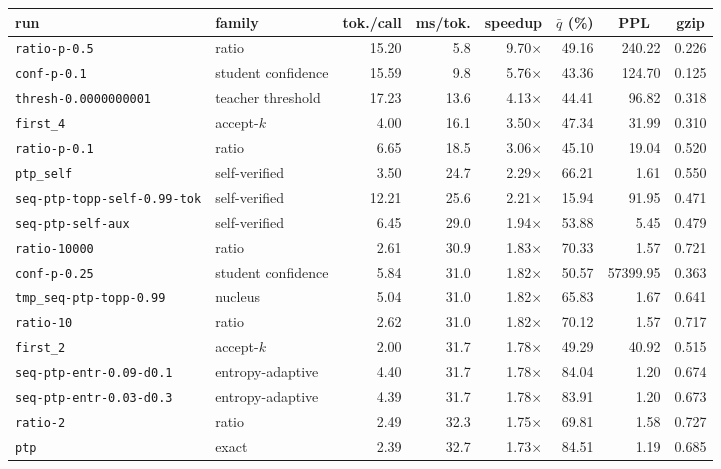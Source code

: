 {\setlength{\tabcolsep}{3pt}%
\begin{tabular}{llrrrrrr}
\toprule
run & family & \multicolumn{1}{c}{tok./call} & \multicolumn{1}{c}{ms/tok.} & \multicolumn{1}{c}{speedup} & \multicolumn{1}{c}{$\bar q$ (\%)} & \multicolumn{1}{c}{PPL} & \multicolumn{1}{c}{gzip} \\
\midrule
\texttt{ratio-p-0.5} & ratio & 15.20 & 5.8 & 9.70$\times$ & 49.16 & 240.22 & 0.226 \\
\texttt{conf-p-0.1} & student confidence & 15.59 & 9.8 & 5.76$\times$ & 43.36 & 124.70 & 0.125 \\
\texttt{thresh-0.0000000001} & teacher threshold & 17.23 & 13.6 & 4.13$\times$ & 44.41 & 96.82 & 0.318 \\
\texttt{first\_4} & accept-$k$ & 4.00 & 16.1 & 3.50$\times$ & 47.34 & 31.99 & 0.310 \\
\texttt{ratio-p-0.1} & ratio & 6.65 & 18.5 & 3.06$\times$ & 45.10 & 19.04 & 0.520 \\
\texttt{ptp\_self} & self-verified & 3.50 & 24.7 & 2.29$\times$ & 66.21 & 1.61 & 0.550 \\
\texttt{seq-ptp-topp-self-0.99-tok} & self-verified & 12.21 & 25.6 & 2.21$\times$ & 15.94 & 91.95 & 0.471 \\
\texttt{seq-ptp-self-aux} & self-verified & 6.45 & 29.0 & 1.94$\times$ & 53.88 & 5.45 & 0.479 \\
\texttt{ratio-10000} & ratio & 2.61 & 30.9 & 1.83$\times$ & 70.33 & 1.57 & 0.721 \\
\texttt{conf-p-0.25} & student confidence & 5.84 & 31.0 & 1.82$\times$ & 50.57 & 57399.95 & 0.363 \\
\texttt{tmp\_seq-ptp-topp-0.99} & nucleus & 5.04 & 31.0 & 1.82$\times$ & 65.83 & 1.67 & 0.641 \\
\texttt{ratio-10} & ratio & 2.62 & 31.0 & 1.82$\times$ & 70.12 & 1.57 & 0.717 \\
\texttt{first\_2} & accept-$k$ & 2.00 & 31.7 & 1.78$\times$ & 49.29 & 40.92 & 0.515 \\
\texttt{seq-ptp-entr-0.09-d0.1} & entropy-adaptive & 4.40 & 31.7 & 1.78$\times$ & 84.04 & 1.20 & 0.674 \\
\texttt{seq-ptp-entr-0.03-d0.3} & entropy-adaptive & 4.39 & 31.7 & 1.78$\times$ & 83.91 & 1.20 & 0.673 \\
\texttt{ratio-2} & ratio & 2.49 & 32.3 & 1.75$\times$ & 69.81 & 1.58 & 0.727 \\
\texttt{ptp} & exact & 2.39 & 32.7 & 1.73$\times$ & 84.51 & 1.19 & 0.685 \\

\end{tabular}}
